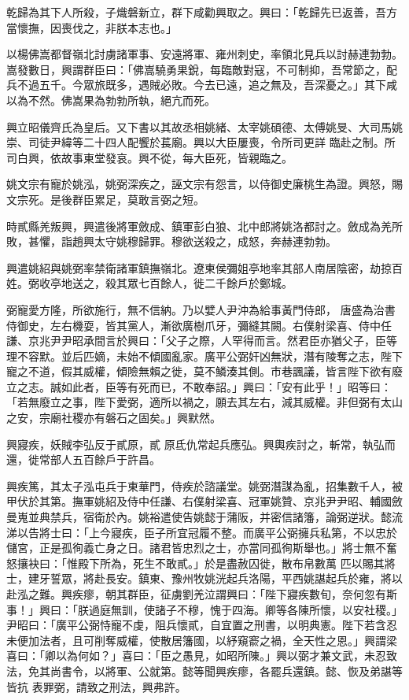 \begin{pinyinscope}
 乾歸為其下人所殺，子熾磐新立，群下咸勸興取之。興曰：「乾歸先已返善，吾方當懷撫，因喪伐之，非朕本志也。」



 以楊佛嵩都督嶺北討虜諸軍事、安遠將軍、雍州刺史，率領北見兵以討赫連勃勃。嵩發數日，興謂群臣曰：「佛嵩驍勇果銳，每臨敵對寇，不可制抑，吾常節之，配兵不過五千。今眾旅既多，遇賊必敗。今去已遠，追之無及，吾深憂之。」其下咸以為不然。佛嵩果為勃勃所執，絕亢而死。



 興立昭儀齊氏為皇后。又下書以其故丞相姚緒、太宰姚碩德、太傅姚旻、大司馬姚崇、司徒尹緯等二十四人配饗於萇廟。興以大臣屢喪，令所司更詳
 臨赴之制。所司白興，依故事東堂發哀。興不從，每大臣死，皆親臨之。



 姚文宗有寵於姚泓，姚弼深疾之，誣文宗有怨言，以侍御史廉桃生為證。興怒，賜文宗死。是後群臣累足，莫敢言弼之短。



 時貳縣羌叛興，興遣後將軍斂成、鎮軍彭白狼、北中郎將姚洛都討之。斂成為羌所敗，甚懼，詣趙興太守姚穆歸罪。穆欲送殺之，成怒，奔赫連勃勃。



 興遣姚紹與姚弼率禁衛諸軍鎮撫嶺北。遼東侯彌姐亭地率其部人南居陰密，劫掠百姓。弼收亭地送之，殺其眾七百餘人，徙二千餘戶於鄭城。



 弼寵愛方隆，所欲施行，無不信納。乃以嬖人尹沖為給事黃門侍郎，
 唐盛為治書侍御史，左右機耍，皆其黨人，漸欲廣樹爪牙，彌縫其闕。右僕射梁喜、侍中任謙、京兆尹尹昭承間言於興曰：「父子之際，人罕得而言。然君臣亦猶父子，臣等理不容默。並后匹嫡，未始不傾國亂家。廣平公弼奸凶無狀，潛有陵奪之志，陛下寵之不道，假其威權，傾險無賴之徙，莫不鱗湊其側。市巷諷議，皆言陛下欲有廢立之志。誠如此者，臣等有死而已，不敢奉詔。」興曰：「安有此乎！」昭等曰：「若無廢立之事，陛下愛弼，適所以禍之，願去其左右，減其威權。非但弼有太山之安，宗廟社稷亦有磐石之固矣。」興默然。



 興寢疾，妖賊李弘反于貳原，貳
 原氐仇常起兵應弘。興輿疾討之，斬常，執弘而還，徙常部人五百餘戶于許昌。



 興疾篤，其太子泓屯兵于東華門，侍疾於諮議堂。姚弼潛謀為亂，招集數千人，被甲伏於其第。撫軍姚紹及侍中任謙、右僕射梁喜、冠軍姚贊、京兆尹尹昭、輔國斂曼嵬並典禁兵，宿衛於內。姚裕遣使告姚懿于蒲阪，并密信諸籓，論弼逆狀。懿流涕以告將士曰：「上今寢疾，臣子所宜冠履不整。而廣平公弼擁兵私第，不以忠於儲宮，正是孤徇義亡身之日。諸君皆忠烈之士，亦當同孤徇斯舉也。」將士無不奮怒攘袂曰：「惟殿下所為，死生不敢貳。」於是盡赦囚徙，散布帛數萬
 匹以賜其將士，建牙誓眾，將赴長安。鎮東、豫州牧姚洸起兵洛陽，平西姚諶起兵於雍，將以赴泓之難。興疾瘳，朝其群臣，征虜劉羌泣謂興曰：「陛下寢疾數旬，奈何忽有斯事！」興曰：「朕過庭無訓，使諸子不穆，愧于四海。卿等各陳所懷，以安社稷。」尹昭曰：「廣平公弼恃寵不虔，阻兵懷貳，自宜置之刑書，以明典憲。陛下若含忍未便加法者，且可削奪威權，使散居籓國，以紓窺窬之禍，全天性之恩。」興謂梁喜曰：「卿以為何如？」喜曰：「臣之愚見，如昭所陳。」興以弼才兼文武，未忍致法，免其尚書令，以將軍、公就第。懿等聞興疾瘳，各罷兵還鎮。懿、恢及弟諶等皆抗
 表罪弼，請致之刑法，興弗許。




\end{pinyinscope}
